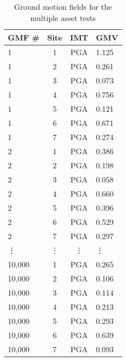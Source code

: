 \begin{table}[htbp]

\centering
\begin{tabular}{ l c c l }

\hline
\rowcolor{anti-flashwhite}
\bf{GMF #} & \bf{Site} & \bf{IMT} & \bf{GMV}\\
\hline
1 & 1 & PGA &  1.125 \\
1 & 2 & PGA &  0.261 \\
1 & 3 & PGA &  0.073 \\
1 & 4 & PGA &  0.756 \\
1 & 5 & PGA &  0.121 \\
1 & 6 & PGA &  0.671 \\
1 & 7 & PGA &  0.274 \\
\hline
2 & 1 & PGA &  0.386 \\
2 & 2 & PGA &  0.198 \\
2 & 3 & PGA &  0.058 \\
2 & 4 & PGA &  0.660 \\
2 & 5 & PGA &  0.396 \\
2 & 6 & PGA &  0.529 \\
2 & 7 & PGA &  0.297 \\
\hline
\vdots & \vdots & \vdots & \vdots \\
\hline
10,000 & 1 & PGA & 0.265 \\
10,000 & 2 & PGA & 0.106 \\
10,000 & 3 & PGA & 0.114 \\
10,000 & 4 & PGA & 0.213 \\
10,000 & 5 & PGA & 0.293 \\
10,000 & 6 & PGA & 0.639 \\
10,000 & 7 & PGA & 0.093 \\
\hline
\end{tabular}

\caption{Ground motion fields for the multiple asset tests}
\label{tab:gmfs-sim-l7-10000}
\end{table}